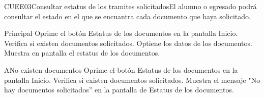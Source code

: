 \begin{UseCase}{CUEE03}{Consultar estatus de los tramites solicitados}{El alumno o egresado podrá consultar el estado en el que se encuantra cada documento que haya solicitado.}
	
	
	
\end{UseCase}

\begin{UCtrayectoria}{Principal}
	\UCpaso [\UCactor] Oprime el botón Estatus de los documentos en la pantalla Inicio.
	\UCpaso Verifica si existen documentos solicitados.
	\UCpaso Optiene los datos de los documentos.
	\UCpaso Muestra en pantalla el estatus de los documentos.
\end{UCtrayectoria}

\begin{UCtrayectoriaA}{A}{No existen documentos}
	\UCpaso [\UCactor] Oprime el botón Estatus de los documentos en la pantalla Inicio.
	\UCpaso Verifica si existen documentos solicitados.
	\UCpaso Muestra el mensaje "No hay documentos solicitados'' en la pantalla de Estatus de los documentos.
\end{UCtrayectoriaA}
